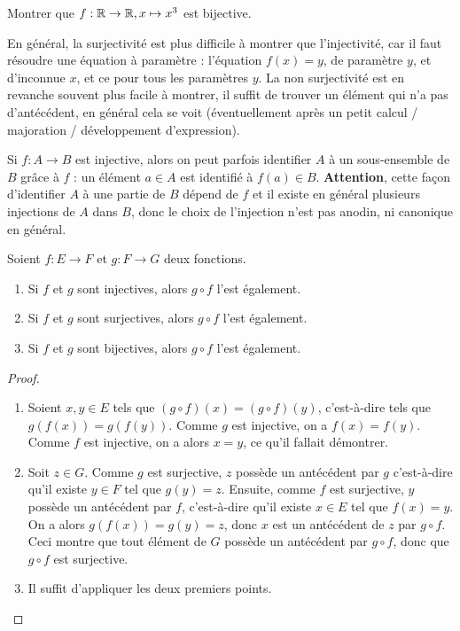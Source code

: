 \begin{exercice}
Montrer que  $f: \mathbb{R}\to \mathbb{R}, x\mapsto x^3$ est bijective.
\end{exercice}

\begin{remarque}
En général, la surjectivité est plus difficile à montrer que l'injectivité, car il faut résoudre une équation à paramètre : l'équation $f(x)=y$, de paramètre $y$, et d'inconnue $x$, et ce pour tous les paramètres $y$. La non surjectivité est en revanche souvent plus facile à montrer, il suffit de trouver un élément qui n'a pas d'antécédent, en général cela se voit (éventuellement après un petit calcul / majoration / développement d'expression).
\end{remarque}

\begin{remarque}
Si $f : A\to B$ est injective, alors on peut parfois \og identifier\fg{} $A$ à un sous-ensemble de $B$ grâce à $f$ : un élément $a \in A$ est identifié à $f(a) \in B$. \textbf{Attention}, cette façon d'identifier $A$ à une partie de $B$ dépend de $f$ et il existe en général plusieurs injections de $A$ dans $B$, donc le choix de l'injection n'est pas anodin, ni canonique en général.
\end{remarque}


\begin{proposition}
Soient $f : E\to F$ et $g : F\to G$ deux fonctions.
\begin{enumerate}
\item Si $f$ et $g$ sont injectives, alors $g\circ f$ l'est également.
\item Si $f$ et $g$ sont surjectives, alors $g\circ f$ l'est également.
\item Si $f$ et $g$ sont bijectives, alors $g\circ f$ l'est également.
\end{enumerate}
\end{proposition}
\begin{proof}
\begin{enumerate}
\item Soient $x, y \in E$ tels que $(g\circ f)(x) = (g\circ f)(y) $, c'est-à-dire tels que $g(f(x))=g(f(y))$. Comme $g$ est injective, on a $f(x)=f(y)$. Comme $f$ est injective, on a alors $x=y$, ce qu'il fallait démontrer.
\item Soit $z\in G$. Comme $g$ est surjective, $z$ possède un antécédent par $g$ c'est-à-dire qu'il existe $y\in F$ tel que $g(y)=z$. Ensuite, comme $f$ est surjective, $y$ possède un antécédent par $f$, c'est-à-dire qu'il existe $x\in E$ tel que $f(x)=y$. On a alors $g(f(x)) = g(y)=z$, donc $x$ est un antécédent de $z$ par $g\circ f$. Ceci montre que tout élément de $G$ possède un antécédent par $g\circ f$, donc que $g\circ f$ est surjective.
\item Il suffit d'appliquer les deux premiers points.
\end{enumerate}
\end{proof}



